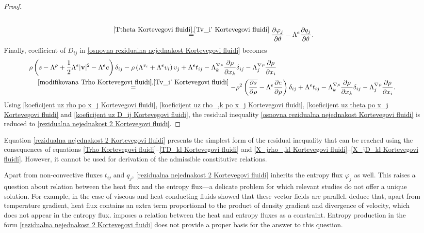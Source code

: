 \documentclass[a4paper,fleqn]{cas-sc}
\theoremstyle{definition}
\begin{document}
\begin{proof}
\begin{align}
		\\
		& \quad\overset{\eqref{Ttheta Kortevegovi fluidi},\eqref{Tv_i' Kortevegovi fluidi}}{=}\dfrac{\partial\varphi_j}{\partial\theta}-\Lambda^e\dfrac{\partial q_j}{\partial\theta}. 
		\nonumber 
	\end{align}
	Finally, coefficient of $D_{ij}$ in \eqref{osnovna rezidualna nejednakost Kortevegovi fluidi} becomes 
	\begin{align} \label{koeficijent uz D_ij Kortevegovi fluidi}
		& \rho \left(s - \Lambda^\rho + \dfrac{1}{2}\Lambda^e\vert\mathbf{v}\vert^2 
		- \Lambda^e e \right) \delta_{ij} 
		- \rho \left( \Lambda^{v_i} + \Lambda^e v_i \right) v_j
		+ \Lambda^et_{ij} - \Lambda^{\nabla\rho}_k\dfrac{\partial\rho}{\partial x_k}\delta_{ij} 
		- \Lambda^{\nabla\rho}_j \dfrac{\partial\rho}{\partial x_i} \\
		& \quad \overset{\eqref{modifikovana Trho Kortevegovi fluidi},\eqref{Tv_i' Kortevegovi fluidi}}{=} 
		- \rho^2 \left(\overline{\dfrac{\partial s}{\partial\rho}} 
		- \Lambda^e\dfrac{\partial e}{\partial\rho}\right) \delta_{ij} 
		+ \Lambda^e t_{ij} - \Lambda^{\nabla\rho}_k \dfrac{\partial\rho}{\partial x_k}\delta_{ij} 
		- \Lambda^{\nabla\rho}_j \dfrac{\partial\rho}{\partial x_i}. 
		\nonumber 
	\end{align}
	Using \eqref{koeficijent uz rho po x_j Kortevegovi fluidi}, \eqref{koeficijent uz rho_,k po x_j Kortevegovi fluidi}, \eqref{koeficijent uz theta po x_j Kortevegovi fluidi} and \eqref{koeficijent uz D_ij Kortevegovi fluidi}, the residual inequality \eqref{osnovna rezidualna nejednakost Kortevegovi fluidi} is reduced to \eqref{rezidualna nejednakost 2 Kortevegovi fluidi}. 
\end{proof}

Equation \eqref{rezidualna nejednakost 2 Kortevegovi fluidi} presents the simplest form of the residual inequality that can be reached using the consequences of equations \eqref{Trho Kortevegovi fluidi}--\eqref{TD_kl Kortevegovi fluidi} and \eqref{X_jrho_,kl Kortevegovi fluidi}--\eqref{X_jD_kl Kortevegovi fluidi}. However, it cannot be used for derivation of the admissible constitutive relations. 

Apart from non-convective fluxes $t_{ij}$ and $q_{j}$, \eqref{rezidualna nejednakost 2 Kortevegovi fluidi} inherits the entropy flux $\varphi_{j}$ as well. This raises a question about relation between the heat flux and the entropy flux---a delicate problem for which relevant studies do not offer a unique solution. For example, in the case of viscous and heat conducting fluids \cite{liu2002continuum} showed that these vector fields are parallel. \cite{anderson1998diffuse} deduce that, apart from temperature gradient, heat flux contains an extra term proportional to the product of density gradient and divergence of velocity, which does not appear in the entropy flux. \cite{van2023holographic} imposes a relation between the heat and entropy fluxes as a constraint. Entropy production in the form \eqref{rezidualna nejednakost 2 Kortevegovi fluidi} does not provide a proper basis for the answer to this question. 
\end{document}
